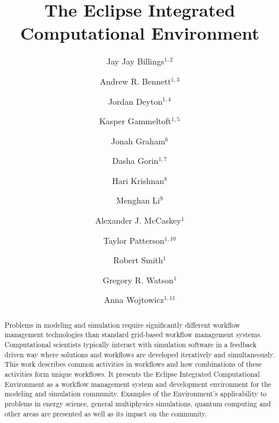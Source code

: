\documentclass{elsart}
\begin{document}
\begin{frontmatter}

\title{The Eclipse Integrated Computational Environment}

\author{Jay Jay Billings$^{1,2}$}
\author{Andrew R. Bennett$^{1,3}$}
\author{Jordan Deyton$^{1,4}$}
\author{Kasper Gammeltoft$^{1,5}$}
\author{Jonah Graham$^{6}$}
\author{Dasha Gorin$^{1,7}$}
\author{Hari Krishnan$^{8}$}
\author{Menghan Li$^{9}$}
\author{Alexander J. McCaskey$^{1}$}
\author{Taylor Patterson$^{1,10}$}
\author{Robert Smith$^{1}$}
\author{Gregory R. Watson$^{1}$}
\author{Anna Wojtowicz$^{1,11}$}

\address{$^{1}$Computer Science and Mathematics Division, Oak Ridge National
Laboratory, Oak Ridge, TN 37830, USA}
\address{$^{2}$The Bredesen Center for Interdisciplinary Research and Graduate
Education, University of Tennessee, 444 Greve Hall, 821 Volunteer
  Blvd. Knoxville, TN 37996-3394}
\address{$^{3}$University of Washington, Seattle, WA 98105}
\address{$^{4}$General Electric Company, 3200 North Grandview Blvd Waukesha, WI
53188-1678}
\address{$^{5}$Georgia Institute of Technology North Avenue, Atlanta, GA 30332}
\address{$^{6}$Kichwa Coders Ltd. 1 Plomer Green Avenue Downley, High Wycombe
HP13 5LN United Kingdom}
\address{$^{7}$Northwestern University 633 Clark Street Evanston, IL 60208}
\address{$^{8}$Lawrence Berkeley National Laboratory, 1 Cyclotron Rd, Berkeley,
CA 94720}
\address{$^{9}$Department of Computer Science, and Department of Biological
Sciences, Purdue University, West Lafayette, IN 47906} 
\address{$^{10}$Acato Information Management, LLC 114 Union Valley Rd. Oak Ridge,
TN 37830}
\address{$^{11}$Colorado State University Fort Collins, CO 80523}

\begin{abstract}

Problems in modeling and simulation require significantly different
workflow management technologies than standard grid-based workflow
management systems. Computational scientists typically interact with
simulation software in a feedback driven way where solutions and
workflows are developed iteratively and simultaneously. This work
describes common activities in workflows and how combinations of these
activities form unique workflows. It presents the Eclipse Integrated
Computational Environment as a workflow management system and
development environment for the modeling and simulation community.
Examples of the Environment's applicability to problems in energy
science, general multiphysics simulations, quantum computing and other
areas are presented as well as its impact on the community.


\end{abstract}
\end{frontmatter}
\end{document}
